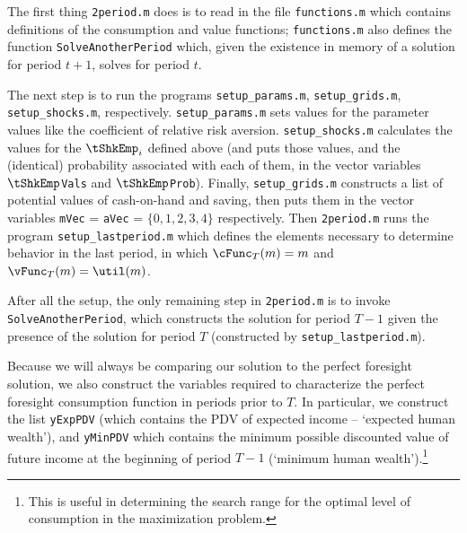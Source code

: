 \documentclass[titlepage]{\econtex}
\begin{document}
The first thing \texttt{2period.m} does is to read in the file
\texttt{functions.m} which contains definitions of the consumption and
value functions; \texttt{functions.m} also defines the function \texttt{SolveAnotherPeriod}
which, given the existence in memory of a solution for period $t+1$,
solves for period $t$.

The next step is to
run the programs \texttt{setup\_params.m}, \texttt{setup\_grids.m},
\texttt{setup\_shocks.m}, respectively. \texttt{setup\_params.m} sets values for the
parameter values like the coefficient of relative risk aversion.
\texttt{setup\_shocks.m} calculates the values for the $\tShkEmp_{i}$
defined above (and puts those values, and the (identical) probability associated
with each of them, in the vector variables \texttt{$\tShkEmp$Vals} and
\texttt{$\tShkEmp$Prob}).  Finally, \texttt{setup\_grids.m} constructs a
list of potential values of cash-on-hand and saving, then puts them in the vector
variables \texttt{mVec} = \texttt{aVec} = $\{0,1,2,3,4\}$ respectively.
Then \texttt{2period.m} runs the program \texttt{setup\_lastperiod.m}
which defines the elements necessary to determine behavior in the last
period, in which $\cFunc_{T}(m)=m$ and $\vFunc_{T}(m)=\util(m)$.

After all the setup, the only remaining step in
\texttt{2period.m} is to invoke \texttt{SolveAnotherPeriod}, which
constructs the solution for period $T-1$ given the presence of the
solution for period $T$ (constructed by \texttt{setup\_lastperiod.m}).

Because we will always be comparing our solution to the perfect
foresight solution, we also construct the variables required to
characterize the perfect foresight consumption function in periods
prior to $T$.  In particular, we construct the list \texttt{yExpPDV}
(which contains the PDV of expected income -- `expected human
wealth'), and \texttt{yMinPDV} which contains the minimum possible
discounted value of future income at the beginning of period $T-1$
(`minimum human wealth').\footnote{This is useful in determining the
  search range for the optimal level of consumption in the
  maximization problem.}
\end{document}
